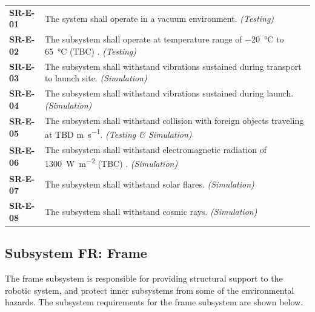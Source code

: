 \documentclass[12pt, letterpaper]{article}
\begin{document}
\begin{longtable}{P{2cm}P{13.75cm}}
\textbf{SR-E-01}	& The system shall operate in a vacuum environment. \textit{(Testing)}													\\
\textbf{SR-E-02}	& The subsystem shall operate at temperature range of \SI{-20}{\degreeCelsius} to \SI{65}{\degreeCelsius} (TBC) \cite{NASAsysreq_Kumar}. \textit{(Testing)}										\\
\textbf{SR-E-03}	& The subsystem shall withstand vibrations sustained during transport to launch site. \textit{(Simulation)}		\\
\textbf{SR-E-04}	& The subsystem shall withstand vibrations sustained during launch. \textit{(Simulation)}						\\
\textbf{SR-E-05}	& The subsystem shall withstand collision with foreign objects traveling at TBD \si{\m\per\s}. \textit{(Testing \& Simulation)}														\\
\textbf{SR-E-06}	& The subsystem shall withstand electromagnetic radiation of \SI{1300}{\watt\per\square\m} (TBC) \cite{FAA_radiation}. \textit{(Simulation)}												\\
\textbf{SR-E-07}	& The subsystem shall withstand solar flares. \textit{(Simulation)}												\\
\textbf{SR-E-08}	& The subsystem shall withstand cosmic rays. \textit{(Simulation)}												\\
\end{longtable}

\subsection{Subsystem FR: Frame}
The frame subsystem is responsible for providing structural support to the robotic system, and protect inner subsystems from some of the environmental hazards. The subsystem requirements for the frame subsystem are shown below.
\end{document}
